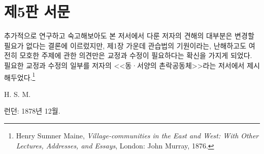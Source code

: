 \chapter*{제5판 서문}

추가적으로 연구하고 숙고해보아도
본 저서에서 다룬 저자의 견해의 대부분은
변경할 필요가 없다는 결론에 이르렀지만,
제1장 가운데
관습법의 기원이라는, 난해하고도 여전히 모호한 주제에 관한 의견만은
교정과 수정이 필요하다는 확신을 가지게 되었다.
필요한 교정과 수정의 일부를
저자의
<<동^^b7서양의 촌락공동체>>라는
저서에서 제시해두었다.\footnote{%
  \latinmarks
  Henry Sumner Maine,
  \textit{Village-communities in the East and West: With Other Lectures,
  Addresses, and Essays},
  London: John Murray, 1876. }

\begin{flushright}
H. S. M.
\end{flushright}

\begin{footnotesize}
런던: 1878년 12월.
\end{footnotesize}

